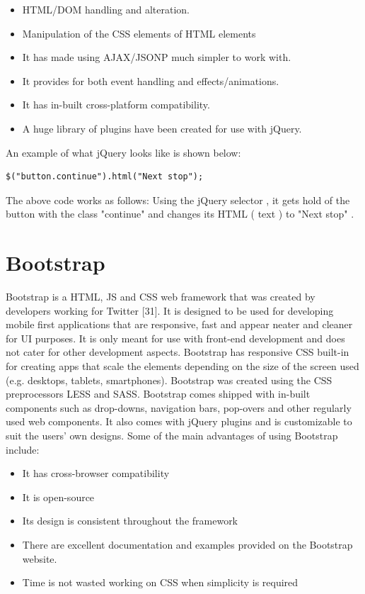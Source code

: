 \begin{itemize}
	\item HTML/DOM handling and alteration.
	\item Manipulation of the CSS elements of HTML elements
	\item It has made using AJAX/JSONP much simpler to work with.
	\item It provides for both event handling and effects/animations.
	\item It has in-built cross-platform compatibility.
	\item A huge library of plugins have been created for use with jQuery.
\end{itemize}
An example of what jQuery looks like is shown below:
\begin{verbatim}
$("button.continue").html("Next stop");
\end{verbatim}
The above code works as follows: Using the jQuery selector \textdollar, it gets hold of the button with the class "continue" and changes its HTML ( text ) to "Next stop" \cite{jquery}.
\section{Bootstrap}
Bootstrap is a HTML, JS and CSS web framework that was created by developers working for Twitter [31]. It is designed to be used for developing mobile first applications that are responsive, fast and appear neater and cleaner for UI purposes. It is only meant for use with front-end development and does not cater for other development aspects. Bootstrap has responsive CSS built-in for creating apps that scale the elements depending on the size of the screen used (e.g. desktops, tablets, smartphones). Bootstrap was created using the CSS preprocessors LESS and SASS. Bootstrap comes shipped with in-built components such as drop-downs, navigation bars, pop-overs and other regularly used web components. It also comes with jQuery plugins and is customizable to suit the users’ own designs. Some of the main advantages of using Bootstrap include: 
\begin{itemize}
	\item It has cross-browser compatibility 
	\item It is open-source
	\item Its design is consistent throughout the framework
	\item There are excellent documentation and examples provided on the Bootstrap website.
	\item Time is not wasted working on CSS when simplicity is required \cite{bootstrap}
\end{itemize}
